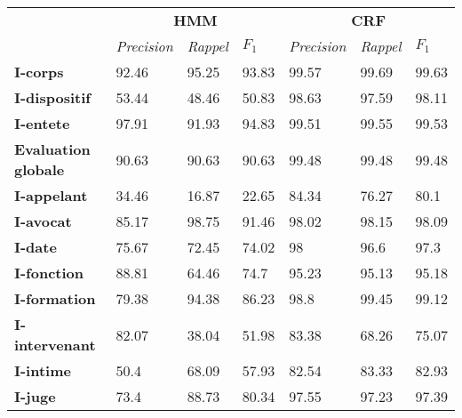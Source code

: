 \begin{table}[!ht]
	\centering
	\scriptsize
	\begin{tabular}{|l|l|l|l|l|l|l|}
		\hline
	\multirow{2}{*}{}	& \multicolumn{3}{c}{\textbf{HMM}}  &      \multicolumn{3}{|c|}{\textbf{CRF}}          \\ \cline{2-7}
		& \textit{Precision} & \textit{Rappel} & $F_1$ & \textit{Precision} & \textit{Rappel} & $F_1$ \\ \hline
		\textbf{I-corps}       & 92.46              & 95.25           & 93.83       & 99.57              & 99.69           & 99.63       \\ 
		\textbf{I-dispositif}  & 53.44              & 48.46           & 50.83       & 98.63              & 97.59           & 98.11       \\ 
		\textbf{I-entete}      & 97.91              & 91.93           & 94.83       & 99.51              & 99.55           & 99.53       \\ \hline
		\textbf{Evaluation globale}       & 90.63              & 90.63           & 90.63       & 99.48              & 99.48           & 99.48       \\ \hline
		\noalign{\smallskip}\hline\noalign{\smallskip}
		\textbf{I-appelant}    & 34.46              & 16.87           & 22.65       & 84.34              & 76.27           & 80.1        \\ 
		\textbf{I-avocat}      & 85.17              & 98.75           & 91.46       & 98.02              & 98.15           & 98.09       \\ 
		\textbf{I-date}        & 75.67              & 72.45           & 74.02       & 98                 & 96.6            & 97.3        \\ 
		\textbf{I-fonction}    & 88.81              & 64.46           & 74.7        & 95.23              & 95.13           & 95.18       \\ 
		\textbf{I-formation}   & 79.38              & 94.38           & 86.23       & 98.8               & 99.45           & 99.12       \\ 
		\textbf{I-intervenant} & 82.07              & 38.04           & 51.98       & 83.38              & 68.26           & 75.07       \\ 
		\textbf{I-intime}      & 50.4               & 68.09           & 57.93       & 82.54              & 83.33           & 82.93       \\ 
		\textbf{I-juge}        & 73.4               & 88.73           & 80.34       & 97.55              & 97.23           & 97.39       \\ 

\end{tabular}
\end{table}
